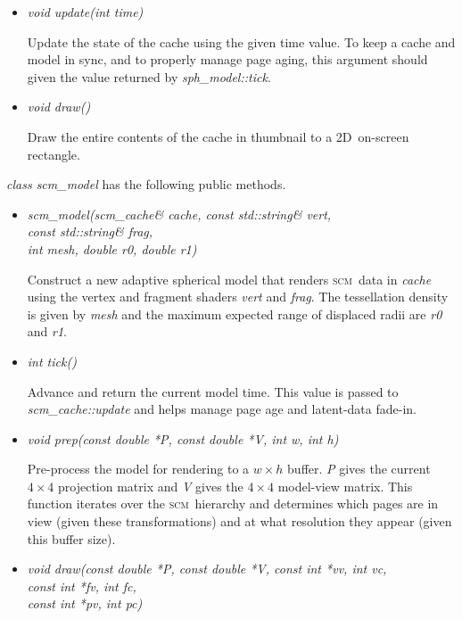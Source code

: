 \documentclass[oneside,10pt]{memoir}
\newcommand{\twod}    {2D}
\newcommand{\scm}     {\textsc{scm}}
\begin{document}
\begin{Spacing}{1.1}
\begin{itemize}
  \item\textit{void update(int time)}

    Update the state of the cache using the given time value. To keep a cache and model in sync, and to properly manage page aging, this argument should given the value returned by \textit{sph\_model::tick}.

  \item\textit{void draw()}

    Draw the entire contents of the cache in thumbnail to a \twod\ on-screen rectangle.

\end{itemize}

\noindent\textit{class scm\_model} has the following public methods.

\begin{itemize}
  \item\textit{scm\_model(scm\_cache\& cache, const std::string\& vert,\\
      \phantom{scm\_model(scm\_cache\& cache,} const std::string\& frag,\\
      \phantom{scm\_model(scm\_cache\& cache,} int mesh, double r0, double r1)}

      Construct a new adaptive spherical model that renders \scm\ data in \textit{cache} using the vertex and fragment shaders \textit{vert} and \textit{frag}. The tessellation density is given by \textit{mesh} and the maximum expected range of displaced radii are \textit{r0} and \textit{r1}.

  \item\textit{int tick()}

    Advance and return the current model time. This value is passed to \textit{scm\_cache::update} and helps manage page age and latent-data fade-in.

  \item\textit{void prep(const double *P, const double *V, int w, int h)}

    Pre-process the model for rendering to a $w\times h$ buffer. \textit{P} gives the current $4\times 4$ projection matrix and \textit{V} gives the $4\times 4$ model-view matrix. This function iterates over the \scm\ hierarchy and determines which pages are in view (given these transformations) and at what resolution they appear (given this buffer size).

  \item\textit{void draw(const double *P, const double *V, const int *vv, int vc,\\
      \phantom{void draw(const double *P, const double *V,} const int *fv, int fc,\\
      \phantom{void draw(const double *P, const double *V,} const int *pv, int pc)}


\end{itemize}
\end{Spacing}
\end{document}
